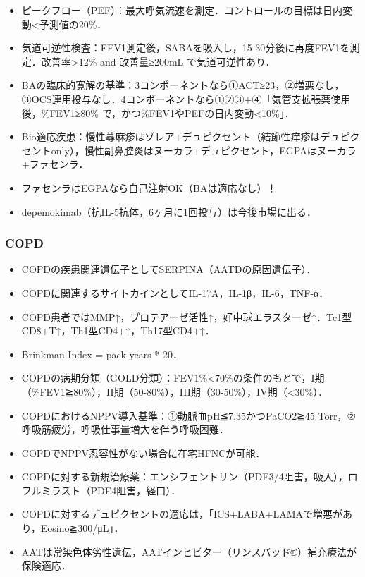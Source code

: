 \begin{itemize}
\item ピークフロー（PEF）：最大呼気流速を測定．コントロールの目標は日内変動<予測値の20\%．
\item 気道可逆性検査：FEV1測定後，SABAを吸入し，15-30分後に再度FEV1を測定．改善率>12\% and 改善量≥200mL で気道可逆性あり．
\item BAの臨床的寛解の基準：3コンポーネントなら①ACT≥23，②増悪なし，③OCS連用投与なし．4コンポーネントなら①②③+④「気管支拡張薬使用後，\%FEV1≥80\% で，かつ\%FEV1やPEFの日内変動<10\%」．
\item Bio適応疾患：慢性蕁麻疹はゾレア+デュピクセント（結節性痒疹はデュピクセントonly），慢性副鼻腔炎はヌーカラ+デュピクセント，EGPAはヌーカラ+ファセンラ．
\item ファセンラはEGPAなら自己注射OK（BAは適応なし）！
\item depemokimab（抗IL-5抗体，6ヶ月に1回投与）は今後市場に出る．

\end{itemize}

\subsubsection{COPD}

\begin{itemize}
\item COPDの疾患関連遺伝子としてSERPINA（AATDの原因遺伝子）．
\item COPDに関連するサイトカインとしてIL-17A，IL-1β，IL-6，TNF-α．
\item COPD患者ではMMP↑，プロテアーゼ活性↑，好中球エラスターゼ↑．Tc1型CD8+T↑，Th1型CD4+↑，Th17型CD4+↑．
\item Brinkman Index = pack-years * 20．
\item COPDの病期分類（GOLD分類）：FEV1\%<70\%の条件のもとで，I期（\%FEV1≧80\%），II期（50-80\%），III期（30-50\%），IV期（<30\%）．


\item COPDにおけるNPPV導入基準：①動脈血pH≦7.35かつPaCO2≧45 Torr，②呼吸筋疲労，呼吸仕事量増大を伴う呼吸困難．
\item COPDでNPPV忍容性がない場合に在宅HFNCが可能．
\item COPDに対する新規治療薬：エンシフェントリン（PDE3/4阻害，吸入），ロフルミラスト（PDE4阻害，経口）．
\item COPDに対するデュピクセントの適応は，「ICS+LABA+LAMAで増悪があり，Eosino≧300/μL」．
\item AATは常染色体劣性遺伝，AATインヒビター（リンスバッド®）補充療法が保険適応．
\end{itemize}


